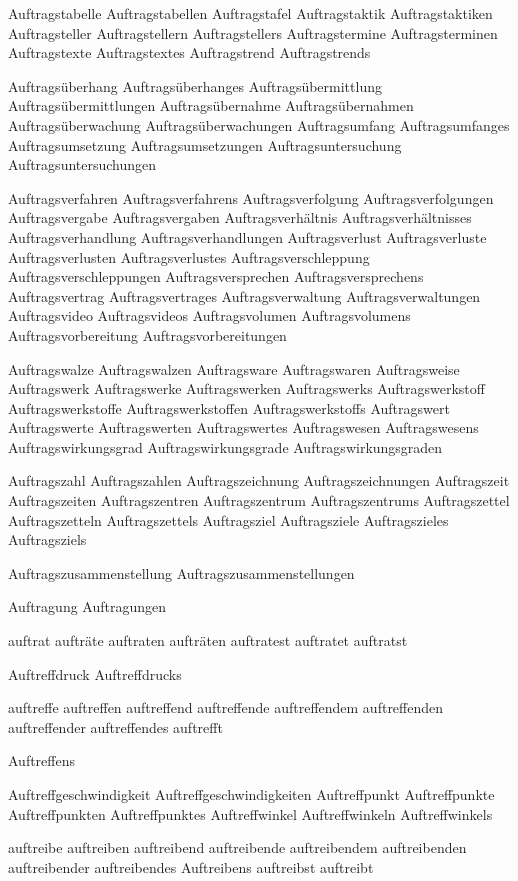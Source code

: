 Auftragstabelle
Auftragstabellen
Auftragstafel
Auftragstaktik
Auftragstaktiken
Auftragsteller
Auftragstellern
Auftragstellers
Auftragstermine
Auftragsterminen
Auftragstexte
Auftragstextes
Auftragstrend
Auftragstrends

Auftragsüberhang
Auftragsüberhanges
Auftragsübermittlung
Auftragsübermittlungen
Auftragsübernahme
Auftragsübernahmen
Auftragsüberwachung
Auftragsüberwachungen
Auftragsumfang
Auftragsumfanges
Auftragsumsetzung
Auftragsumsetzungen
Auftragsuntersuchung
Auftragsuntersuchungen

Auftragsverfahren
Auftragsverfahrens
Auftragsverfolgung
Auftragsverfolgungen
Auftragsvergabe
Auftragsvergaben
Auftragsverhältnis
Auftragsverhältnisses
Auftragsverhandlung
Auftragsverhandlungen
Auftragsverlust
Auftragsverluste
Auftragsverlusten
Auftragsverlustes
Auftragsverschleppung
Auftragsverschleppungen
Auftragsversprechen
Auftragsversprechens
Auftragsvertrag
Auftragsvertrages
Auftragsverwaltung
Auftragsverwaltungen
Auftragsvideo
Auftragsvideos
Auftragsvolumen
Auftragsvolumens
Auftragsvorbereitung
Auftragsvorbereitungen

Auftragswalze
Auftragswalzen
Auftragsware
Auftragswaren
Auftragsweise
Auftragswerk
Auftragswerke
Auftragswerken
Auftragswerks
Auftragswerkstoff
Auftragswerkstoffe
Auftragswerkstoffen
Auftragswerkstoffs
Auftragswert
Auftragswerte
Auftragswerten
Auftragswertes
Auftragswesen
Auftragswesens
Auftragswirkungsgrad
Auftragswirkungsgrade
Auftragswirkungsgraden

Auftragszahl
Auftragszahlen
Auftragszeichnung
Auftragszeichnungen
Auftragszeit
Auftragszeiten
Auftragszentren
Auftragszentrum
Auftragszentrums
Auftragszettel
Auftragszetteln
Auftragszettels
Auftragsziel
Auftragsziele
Auftragszieles
Auftragsziels

Auftragszusammenstellung
Auftragszusammenstellungen

Auftragung
Auftragungen

auftrat
aufträte
auftraten
aufträten
auftratest
auftratet
auftratst

Auftreffdruck
Auftreffdrucks

auftreffe
auftreffen
auftreffend
auftreffende
auftreffendem
auftreffenden
auftreffender
auftreffendes
auftrefft

Auftreffens

Auftreffgeschwindigkeit
Auftreffgeschwindigkeiten
Auftreffpunkt
Auftreffpunkte
Auftreffpunkten
Auftreffpunktes
Auftreffwinkel
Auftreffwinkeln
Auftreffwinkels

auftreibe
auftreiben
auftreibend
auftreibende
auftreibendem
auftreibenden
auftreibender
auftreibendes
Auftreibens
auftreibst
auftreibt


